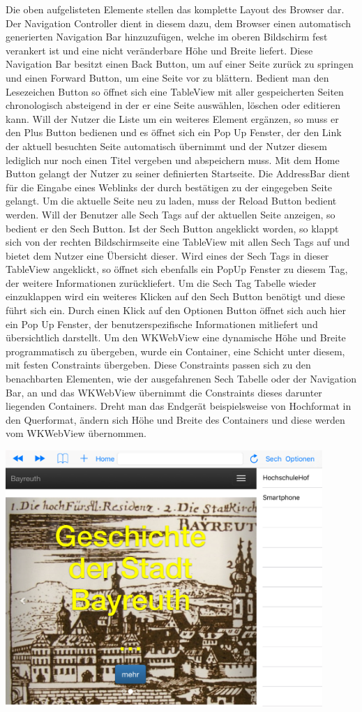 Die oben aufgelisteten Elemente stellen das komplette Layout des Browser dar. Der Navigation Controller dient in diesem dazu, dem Browser einen automatisch generierten Navigation Bar hinzuzufügen, welche im oberen Bildschirm fest verankert ist und eine nicht veränderbare Höhe und Breite liefert. Diese Navigation Bar besitzt einen Back Button, um auf einer Seite zurück zu springen und einen Forward Button, um eine Seite vor zu blättern. Bedient man den Lesezeichen Button so öffnet sich eine TableView mit aller gespeicherten Seiten chronologisch absteigend in der er eine Seite auswählen, löschen oder editieren kann. Will der Nutzer die Liste um ein weiteres Element ergänzen, so muss er den Plus Button bedienen und es öffnet sich ein Pop Up Fenster, der den Link der aktuell besuchten Seite automatisch übernimmt und der Nutzer diesem lediglich nur noch einen Titel vergeben und abspeichern muss. Mit dem Home Button gelangt der Nutzer zu seiner definierten Startseite. Die AddressBar dient für die Eingabe eines Weblinks der durch bestätigen zu der eingegeben Seite gelangt. Um die aktuelle Seite neu zu laden, muss der Reload Button bedient werden. Will der Benutzer alle Sech Tags auf der aktuellen Seite anzeigen, so bedient er den Sech Button. Ist der Sech Button angeklickt worden, so klappt sich von der rechten Bildschirmseite eine TableView mit allen Sech Tags auf und bietet dem Nutzer eine Übersicht dieser. Wird eines der Sech Tags in dieser TableView angeklickt, so öffnet sich ebenfalls ein PopUp Fenster zu diesem Tag, der weitere Informationen zurückliefert. Um die Sech Tag Tabelle wieder einzuklappen wird ein weiteres Klicken auf den Sech Button benötigt und diese führt sich ein. Durch einen Klick auf den Optionen Button öffnet sich auch hier ein Pop Up Fenster, der benutzerspezifische Informationen mitliefert und übersichtlich darstellt. Um den WKWebView eine dynamische Höhe und Breite programmatisch zu übergeben, wurde ein Container, eine Schicht unter diesem, mit festen Constraints übergeben. Diese Constraints passen sich zu den benachbarten Elementen, wie der ausgefahrenen Sech Tabelle oder der Navigation Bar, an und das WKWebView übernimmt die Constraints dieses darunter liegenden Containers. Dreht man das Endgerät beispielsweise von Hochformat in den Querformat, ändern sich Höhe und Breite des Containers und diese werden vom WKWebView übernommen.

\includegraphics[width=12cm]{Pics/Browser_Hochformat}



